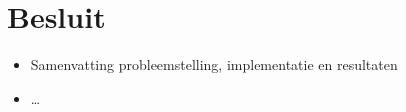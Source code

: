 \chapter{Besluit}

\begin{itemize}
\item Samenvatting probleemstelling, implementatie en resultaten
\item \ldots
\end{itemize}